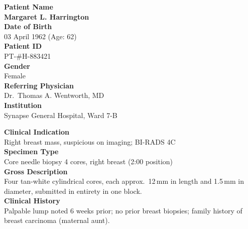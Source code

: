 \documentclass[11pt,a4paper]{article}
\newcommand{\fieldlabel}[1]{\textcolor{PathMidGray}{\footnotesize\textbf{#1}}}
\newcommand{\fieldval}[1]{\textcolor{PathBlue}{\small #1}}
\begin{document}
\begin{tcolorbox}[sectionbox, title={\faUser\quad Patient \& Clinical Information}]
\begin{minipage}[t]{0.48\linewidth}
  \vspace{0pt}
  \fieldlabel{Patient Name}\\
  \fieldval{\textbf{Margaret L. Harrington}}\\[6pt]
  \fieldlabel{Date of Birth}\\
  \fieldval{03 April 1962 \quad (Age: 62)}\\[6pt]
  \fieldlabel{Patient ID}\\
  \fieldval{PT-\#{}H-883421}\\[6pt]
  \fieldlabel{Gender}\\
  \fieldval{Female}\\[6pt]
  \fieldlabel{Referring Physician}\\
  \fieldval{Dr.\ Thomas A. Wentworth, MD}\\[6pt]
  \fieldlabel{Institution}\\
  \fieldval{Synapse General Hospital, Ward 7-B}
\end{minipage}%
\begin{minipage}[t]{0.04\linewidth}
  \vspace{0pt}
\end{minipage}%
\begin{minipage}[t]{0.48\linewidth}
  \vspace{0pt}
  \fieldlabel{Clinical Indication}\\
  \fieldval{Right breast mass, suspicious on imaging; BI-RADS 4C}\\[6pt]
  \fieldlabel{Specimen Type}\\
  \fieldval{Core needle biopsy \texttimes{} 4 cores, right breast (2:00 position)}\\[6pt]
  \fieldlabel{Gross Description}\\
  \fieldval{Four tan-white cylindrical cores, each approx.\ 12\,mm in length and 1.5\,mm in diameter, submitted in entirety in one block.}\\[6pt]
  \fieldlabel{Clinical History}\\
  \fieldval{Palpable lump noted 6 weeks prior; no prior breast biopsies; family history of breast carcinoma (maternal aunt).}
\end{minipage}
\end{tcolorbox}

\vspace{4pt}
\end{document}
